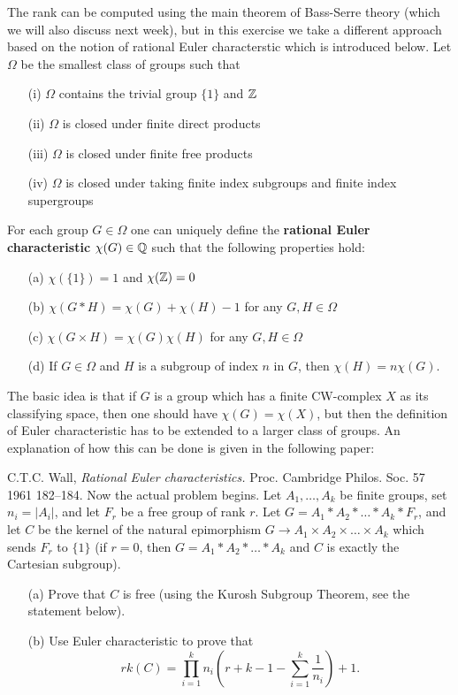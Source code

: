\documentclass[12pt]{amsart}
\begin{document}
The rank can be computed using the main theorem of Bass-Serre theory (which we will also discuss next week),
but in this exercise we take a different approach based on the notion of rational Euler characterstic which is introduced below.
\skv
Let $\Omega$ be the smallest class of groups such that
\begin{itemize}
\item[(i)] $\Omega$ contains the trivial group $\{1\}$ and ${\mathbb Z}$
\item[(ii)] $\Omega$ is closed under finite direct products
\item[(iii)] $\Omega$ is closed under finite free products
\item[(iv)] $\Omega$ is closed under taking finite index subgroups
and finite index supergroups
\end{itemize}
For each group $G\in\Omega$ one can uniquely define the {\bf rational Euler characteristic}
$\chi(G)\in{\mathbb Q}$ such that the following properties hold:
\begin{itemize}
\item[(a)] $\chi(\{1\})=1$ and $\chi({\mathbb Z})=0$
\item[(b)] $\chi(G\ast H)=\chi(G)+ \chi(H)-1$ for any $G,H\in\Omega$ 
\item[(c)] $\chi(G\times H)=\chi(G)\chi(H)$ for any $G,H\in\Omega$
\item[(d)] If $G\in\Omega$ and $H$ is a subgroup of index $n$ in $G$,
then $\chi(H)=n\chi(G)$.
\end{itemize}
The basic idea is that if $G$ is a group which has a finite CW-complex $X$
as its classifying space, then one should have $\chi(G)=\chi(X)$, but
then the definition of Euler characteristic has to be extended
to a larger class of groups. An explanation of how this can be done
is given in the following paper: 

C.T.C. Wall, {\it Rational Euler characteristics.} 
Proc. Cambridge Philos. Soc. 57 1961 182--184.
\skv
Now the actual problem begins. Let $A_1,\ldots, A_k$ be finite groups, set $n_i=|A_i|$,
and let $F_r$ be a free group of rank $r$. Let  $G=A_1\ast A_2\ast\ldots\ast A_k\ast F_r$, 
and let $C$ be the kernel of the natural epimorphism $G\to A_1\times A_2\times\ldots\times A_k$
which sends $F_r$ to $\{1\}$ (if $r=0$, then $G=A_1\ast A_2\ast\ldots\ast A_k$ and
$C$ is exactly the Cartesian subgroup).
\begin{itemize}
\item[(a)] Prove that $C$ is free (using the Kurosh Subgroup Theorem, see the statement below).
\item[(b)] Use Euler characteristic to prove that $$rk(C)=\prod_{i=1}^k n_i (r+k-1-\sum_{i=1}^k\frac{1}{n_i})+1.$$
\end{itemize}
\end{document}

